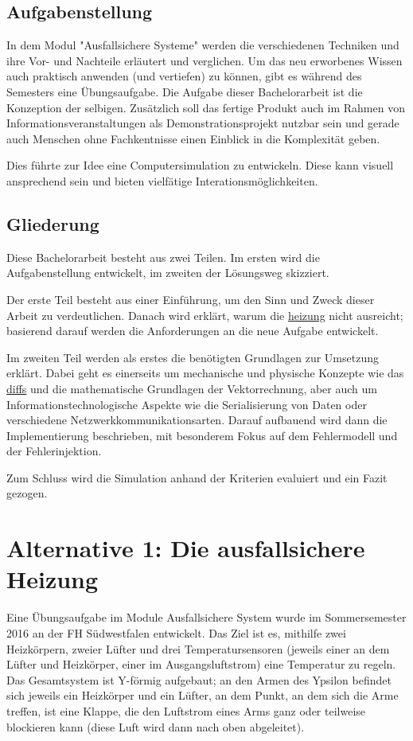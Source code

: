 \subsection{Aufgabenstellung} In dem Modul "Ausfallsichere Systeme" werden die verschiedenen Techniken und ihre Vor- und Nachteile
erl{\"{a}}utert und verglichen. Um das neu erworbenes Wissen auch praktisch anwenden (und vertiefen) zu k{\"{o}}nnen, gibt es w{\"{a}}hrend des Semesters eine {\"{U}}bungsaufgabe.
Die Aufgabe dieser Bachelorarbeit ist die Konzeption der selbigen. Zus{\"{a}}tzlich soll das fertige Produkt auch im Rahmen von Informationsveranstaltungen als Demonstrationsprojekt
nutzbar sein und gerade auch Menschen ohne Fachkentnisse einen Einblick in die Komplexit{\"{a}}t geben.

Dies f{\"{u}}hrte zur Idee eine Computersimulation zu entwickeln. Diese kann visuell ansprechend sein und bieten vielf{\"{a}}tige Interationsm{\"{o}}glichkeiten.

\subsection{Gliederung} Diese Bachelorarbeit besteht aus zwei Teilen. Im ersten wird die Aufgabenstellung entwickelt, im zweiten der L{\"{o}}sungsweg skizziert.

Der erste Teil besteht aus einer Einf{\"{u}}hrung, um den Sinn und Zweck dieser Arbeit zu verdeutlichen. Danach wird erkl{\"{a}}rt, warum die \hyperref[existierende {\"{U}}bungsaufgabe]{heizung}
nicht ausreicht; basierend darauf werden die Anforderungen an die neue Aufgabe entwickelt.

Im zweiten Teil werden als erstes die ben{\"{o}}tigten Grundlagen zur Umsetzung erkl{\"{a}}rt. Dabei geht es einerseits um mechanische und physische Konzepte wie das
\hyperref[\textit{differential steering}]{diffs} und die mathematische Grundlagen der Vektorrechnung, aber auch um Informationstechnologische Aspekte wie die Serialisierung von Daten oder
verschiedene Netzwerkkommunikationsarten. Darauf aufbauend wird dann die Implementierung beschrieben, mit besonderem Fokus auf dem Fehlermodell und der
Fehlerinjektion.

Zum Schluss wird die Simulation anhand der Kriterien evaluiert und ein Fazit gezogen.

\clearpage
\section{Alternative 1: Die ausfallsichere Heizung}\label{heizung}
Eine {\"{U}}bungsaufgabe im Module Ausfallsichere System wurde im Sommersemester 2016 an der FH S{\"{u}}dwestfalen entwickelt. Das Ziel ist es, mithilfe zwei Heizk{\"{o}}rpern, zweier
L{\"{u}}fter und drei Temperatursensoren (jeweils einer an dem L{\"{u}}fter und Heizk{\"{o}}rper, einer im Ausgangsluftstrom) eine Temperatur zu regeln.
Das Gesamtsystem ist Y-f{\"{o}}rmig aufgebaut; an den Armen des Ypsilon befindet sich jeweils ein Heizk{\"{o}}rper und ein L{\"{u}}fter, an dem Punkt, an dem sich
die Arme treffen, ist eine Klappe, die den Luftstrom eines Arms ganz oder teilweise blockieren kann (diese Luft wird dann nach oben abgeleitet).

